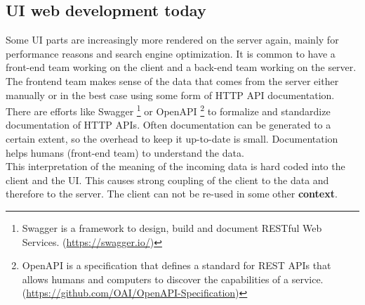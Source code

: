\subsection{UI web development today}\label{uidevelopmenttoday}
Some UI parts are increasingly more rendered on the server again, mainly for performance reasons and search engine optimization. It is common to have a front-end team working on the client and a back-end team working on the server. The frontend team makes sense of the data that comes from the server either manually or in the best case using some form of HTTP API documentation.
\\ There are efforts like Swagger \footnote{Swagger is a framework to design, build and document RESTful Web Services. (\url{https://swagger.io/})} or OpenAPI \footnote{OpenAPI is a specification that defines a standard for REST APIs that allows humans and computers to discover the capabilities of a service. (\url{https://github.com/OAI/OpenAPI-Specification})} to formalize and standardize documentation of HTTP APIs. Often documentation can be generated to a certain extent, so the overhead to keep it up-to-date is small. Documentation helps humans (front-end team) to understand the data.
\\ This interpretation of the meaning of the incoming data is hard coded into the client and the UI. This causes strong coupling of the client to the data and therefore to the server. The client can not be re-used in some other \textbf{context}.

